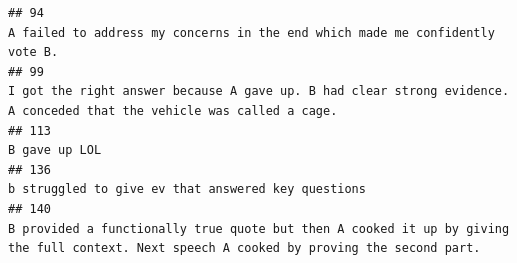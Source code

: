 \documentclass[
]{article}
\begin{document}
\begin{verbatim}
## 94                                                                                                                                                                                                                                                                                                                                                                                                                                                                                                                        A failed to address my concerns in the end which made me confidently vote B.
## 99                                                                                                                                                                                                                                                                                                                                                                                                                                                                               I got the right answer because A gave up. B had clear strong evidence. A conceded that the vehicle was called a cage.
## 113                                                                                                                                                                                                                                                                                                                                                                                                                                                                                                                                                                                      B gave up LOL
## 136                                                                                                                                                                                                                                                                                                                                                                                                                                                                                                                                                 b struggled to give ev that answered key questions
## 140                                                                                                                                                                                                                                                                                                                                                                                                                                                          B provided a functionally true quote but then A cooked it up by giving the full context. Next speech A cooked by proving the second part.

\end{verbatim}
\end{document}
